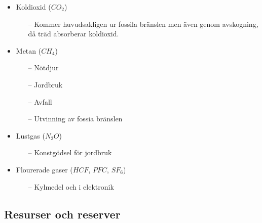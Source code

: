 \documentclass{article}
\begin{document}
\begin{itemize}
    \item{Koldioxid ($CO_2$)}
    \begin{itemize}
        \item[--] Kommer huvudsakligen ur fossila bränslen men även genom avskogning, då träd absorberar koldioxid.
    \end{itemize}
    \item{Metan ($CH_4$)}
    \begin{itemize}
        \item[--] Nötdjur
        \item[--] Jordbruk
        \item[--] Avfall
        \item[--] Utvinning av fossia bränslen
    \end{itemize} 
    \item{Lustgas ($N_2O$)}
    \begin{itemize}
        \item[--] Konstgödsel för jordbruk
    \end{itemize}
    \item{Flourerade gaser ($HCF$, $PFC$, $SF_6$)}
    \begin{itemize}
        \item[--] Kylmedel och i elektronik
    \end{itemize}
\end{itemize}

\subsection{Resurser och reserver}
\end{document}
